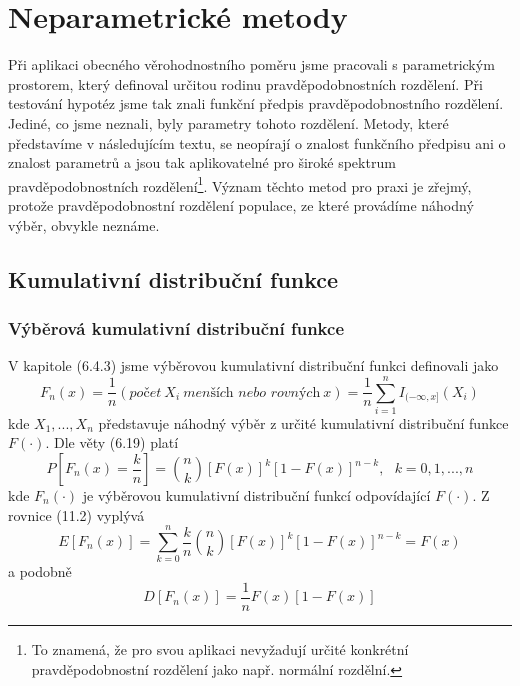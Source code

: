 \chapter{Neparametrické metody}

Při aplikaci obecného věrohodnostního poměru jsme pracovali s parametrickým prostorem, který definoval určitou rodinu pravděpodobnostních rozdělení. Při testování hypotéz jsme tak znali funkční předpis pravděpodobnostního rozdělení. Jediné, co jsme neznali, byly parametry tohoto rozdělení. Metody, které představíme v následujícím textu, se neopírají o znalost funkčního předpisu ani o znalost parametrů a jsou tak aplikovatelné pro široké spektrum pravděpodobnostních rozdělení\footnote{To znamená, že pro svou aplikaci nevyžadují určité konkrétní pravděpodobnostní rozdělení jako např. normální rozdělní.}. Význam těchto metod pro praxi je zřejmý, protože pravděpodobnostní rozdělení populace, ze které provádíme náhodný výběr, obvykle neznáme.

\section{Kumulativní distribuční funkce}

\subsection{Výběrová kumulativní distribuční funkce}

V kapitole (6.4.3) jsme výběrovou kumulativní distribuční funkci definovali jako
\begin{equation*}
F_n(x) = \frac{1}{n}(\textit{počet} ~ X_i ~ \textit{menších nebo rovných} ~ x) = \frac{1}{n}\sum_{i = 1}^n I_{(-\infty, x]}(X_i)
\end{equation*}
kde $X_1, ..., X_n$ představuje náhodný výběr z určité kumulativní distribuční funkce $F(\cdot)$. Dle věty (6.19) platí
\begin{equation}
P\left[F_n(x) = \frac{k}{n}\right] = \binom{n}{k}[F(x)]^k[1 - F(x)]^{n - k}, ~~~ k = 0, 1, ..., n
\end{equation}
kde $F_n(\cdot)$ je výběrovou kumulativní distribuční funkcí odpovídající $F(\cdot)$. Z rovnice (11.2) vyplývá
\begin{equation}
E[F_n(x)] = \sum_{k = 0}^n \frac{k}{n}\binom{n}{k}[F(x)]^k[1 - F(x)]^{n - k} = F(x)
\end{equation}
a podobně
\begin{equation}
D[F_n(x)] = \frac{1}{n}F(x)[1 - F(x)]
\end{equation}

